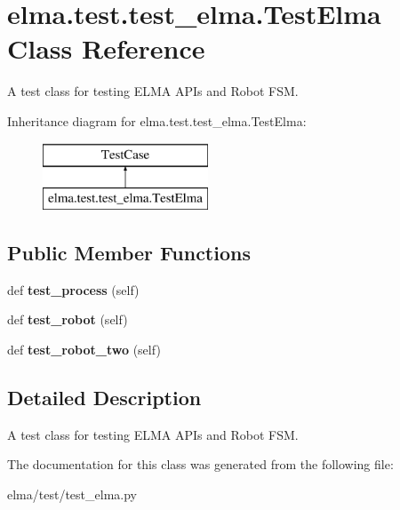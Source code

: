 \hypertarget{classelma_1_1test_1_1test__elma_1_1TestElma}{}\section{elma.\+test.\+test\+\_\+elma.\+Test\+Elma Class Reference}
\label{classelma_1_1test_1_1test__elma_1_1TestElma}


A test class for testing E\+L\+MA A\+P\+Is and Robot F\+SM.  


Inheritance diagram for elma.\+test.\+test\+\_\+elma.\+Test\+Elma\+:\begin{figure}[H]
\begin{center}
\leavevmode
\includegraphics[height=2.000000cm]{classelma_1_1test_1_1test__elma_1_1TestElma}
\end{center}
\end{figure}
\subsection*{Public Member Functions}
\begin{DoxyCompactItemize}
\item 
\mbox{\label{classelma_1_1test_1_1test__elma_1_1TestElma_a08a7479359af5f71989bd49ed065391b}} 
def {\bfseries test\+\_\+process} (self)
\item 
\mbox{\label{classelma_1_1test_1_1test__elma_1_1TestElma_a168e8341dac5e84682a83c7dd93c5cc7}} 
def {\bfseries test\+\_\+robot} (self)
\item 
\mbox{\label{classelma_1_1test_1_1test__elma_1_1TestElma_a295c71bd47bb411f73b9715f5846ae2c}} 
def {\bfseries test\+\_\+robot\+\_\+two} (self)
\end{DoxyCompactItemize}


\subsection{Detailed Description}
A test class for testing E\+L\+MA A\+P\+Is and Robot F\+SM. 

The documentation for this class was generated from the following file\+:\begin{DoxyCompactItemize}
\item 
elma/test/test\+\_\+elma.\+py\end{DoxyCompactItemize}
